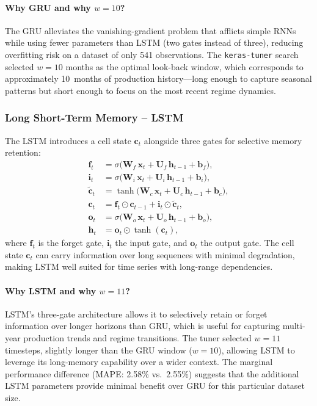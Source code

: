 \documentclass[12pt,a4paper]{article}
\begin{document}
\paragraph{Why GRU and why $w = 10$?}
The GRU alleviates the vanishing-gradient problem that afflicts simple RNNs while using fewer parameters than LSTM (two gates instead of three), reducing overfitting risk on a dataset of only 541 observations. The \texttt{keras-tuner} search selected $w = 10$ months as the optimal look-back window, which corresponds to approximately 10~months of production history---long enough to capture seasonal patterns but short enough to focus on the most recent regime dynamics.

\subsubsection{Long Short-Term Memory -- LSTM}

The LSTM \citep{hochreiter1997} introduces a cell state $\mathbf{c}_t$ alongside three gates for selective memory retention:
\begin{align}
  \mathbf{f}_t &= \sigma\!\bigl(\mathbf{W}_f\,\mathbf{x}_t + \mathbf{U}_f\,\mathbf{h}_{t-1} + \mathbf{b}_f\bigr), \label{eq:lstm_forget}\\
  \mathbf{i}_t &= \sigma\!\bigl(\mathbf{W}_i\,\mathbf{x}_t + \mathbf{U}_i\,\mathbf{h}_{t-1} + \mathbf{b}_i\bigr), \label{eq:lstm_input}\\
  \tilde{\mathbf{c}}_t &= \tanh\!\bigl(\mathbf{W}_c\,\mathbf{x}_t + \mathbf{U}_c\,\mathbf{h}_{t-1} + \mathbf{b}_c\bigr), \label{eq:lstm_candidate}\\
  \mathbf{c}_t &= \mathbf{f}_t \odot \mathbf{c}_{t-1} + \mathbf{i}_t \odot \tilde{\mathbf{c}}_t, \label{eq:lstm_cell}\\
  \mathbf{o}_t &= \sigma\!\bigl(\mathbf{W}_o\,\mathbf{x}_t + \mathbf{U}_o\,\mathbf{h}_{t-1} + \mathbf{b}_o\bigr), \label{eq:lstm_outputgate}\\
  \mathbf{h}_t &= \mathbf{o}_t \odot \tanh(\mathbf{c}_t), \label{eq:lstm_hidden}
\end{align}
where $\mathbf{f}_t$ is the forget gate, $\mathbf{i}_t$ the input gate, and $\mathbf{o}_t$ the output gate. The cell state $\mathbf{c}_t$ can carry information over long sequences with minimal degradation, making LSTM well suited for time series with long-range dependencies.

\paragraph{Why LSTM and why $w = 11$?}
LSTM's three-gate architecture allows it to selectively retain or forget information over longer horizons than GRU, which is useful for capturing multi-year production trends and regime transitions. The tuner selected $w = 11$ timesteps, slightly longer than the GRU window ($w = 10$), allowing LSTM to leverage its long-memory capability over a wider context. The marginal performance difference (MAPE: 2.58\% vs.\ 2.55\%) suggests that the additional LSTM parameters provide minimal benefit over GRU for this particular dataset size.
\end{document}
